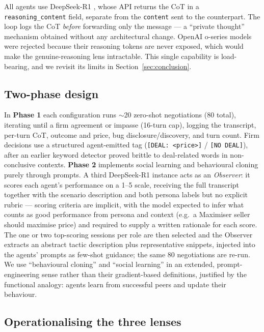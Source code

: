 \documentclass[pdflatex,sn-mathphys-num]{sn-jnl}%
\theoremstyle{thmstyleone}%
\theoremstyle{thmstyletwo}%
\theoremstyle{thmstylethree}%
\begin{document}
All agents use DeepSeek-R1 \cite{deepseekr1}, whose API returns the CoT in a \texttt{reasoning\_content} field, separate from the \texttt{content} sent to the counterpart. The loop logs the CoT \emph{before} forwarding only the message --- a ``private thought'' mechanism obtained without any architectural change. OpenAI o-series models were rejected because their reasoning tokens are never exposed, which would make the genuine-reasoning lens intractable. This single capability is load-bearing, and we revisit its limits in Section~\ref{sec:conclusion}.

\subsection{Two-phase design}\label{subsec:phases}

In \textbf{Phase 1} each configuration runs $\sim$20 zero-shot negotiations (80 total), iterating until a firm agreement or impasse (16-turn cap), logging the transcript, per-turn CoT, outcome and price, bug disclosure/discovery, and turn count. Firm decisions use a structured agent-emitted tag (\texttt{[DEAL: <price>]} / \texttt{[NO DEAL]}), after an earlier keyword detector proved brittle to deal-related words in non-conclusive contexts. \textbf{Phase 2} implements social learning and behavioural cloning purely through prompts. A third DeepSeek-R1 instance acts as an \emph{Observer}: it scores each agent's performance on a 1--5 scale, receiving the full transcript together with the scenario description and both persona labels but no explicit rubric --- scoring criteria are implicit, with the model expected to infer what counts as good performance from persona and context (e.g.\ a Maximiser seller should maximise price) and required to supply a written rationale for each score. The one or two top-scoring sessions per role are then selected and the Observer extracts an abstract tactic description plus representative snippets, injected into the agents' prompts as few-shot guidance; the same 80 negotiations are re-run. We use ``behavioural cloning'' and ``social learning'' in an extended, prompt-engineering sense rather than their gradient-based definitions, justified by the functional analogy: agents learn from successful peers and update their behaviour.

\subsection{Operationalising the three lenses}\label{subsec:metrics}
\end{document}
